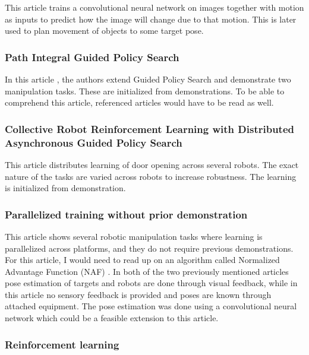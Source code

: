 This article \cite{finn2016deep} trains a convolutional neural network on
images together with motion as inputs to predict how the image will change due
to that motion. This is later used to plan movement of objects to some target
pose.

\subsubsection{Path Integral Guided Policy Search}

In this article \cite{chebotar2016path}, the authors extend Guided Policy
Search and demonstrate two manipulation tasks. These are initialized from
demonstrations. To be able to comprehend this article, referenced articles
\cite{levine2016end,theodorou2010generalized,montgomery2016guided} would have
to be read as well.

\subsubsection{Collective Robot Reinforcement Learning with Distributed
               Asynchronous Guided Policy Search}

This article \cite{yahya2016collective} distributes learning of
door opening across several robots. The exact nature of the tasks
are varied across robots to increase robustness. The learning is
initialized from demonstration.

\subsubsection{Parallelized training without prior demonstration}

This article \cite{gu2016deep} shows several robotic manipulation tasks where
learning is parallelized across platforms, and they do not require previous
demonstrations.  For this article, I would need to read up on an algorithm
called Normalized Advantage Function (NAF) \cite{gu2016continuous}. In both of
the two previously mentioned articles
\cite{chebotar2016path,yahya2016collective} pose estimation of targets and
robots are done through visual feedback, while in this article
\cite{gu2016deep} no sensory feedback is provided and poses are known through
attached equipment. The pose estimation was done using a convolutional neural
network which could be a feasible extension to this article.


\subsubsection{Reinforcement learning}

